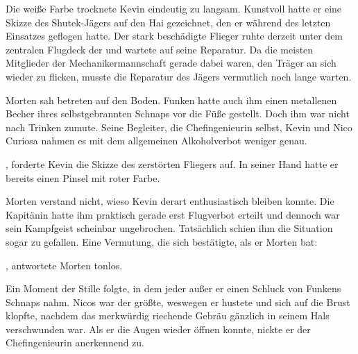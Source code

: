 Die weiße Farbe trocknete Kevin eindeutig zu langsam. Kunstvoll hatte er eine Skizze des Shutek-Jägers auf den Hai gezeichnet, den er während des letzten Einsatzes geflogen hatte. Der stark beschädigte Flieger ruhte derzeit unter dem zentralen Flugdeck der  und wartete auf seine Reparatur. Da die meisten Mitglieder der Mechanikermannschaft gerade dabei waren, den Träger an sich wieder zu flicken, musste die Reparatur des Jägers vermutlich noch lange warten.

\par

Morten sah betreten auf den Boden. Funken hatte auch ihm einen metallenen Becher ihres selbstgebrannten Schnaps vor die Füße gestellt. Doch ihm war nicht nach Trinken zumute. Seine Begleiter, die Chefingenieurin selbst, Kevin und Nico Curiosa nahmen es mit dem allgemeinen Alkoholverbot weniger genau.

\par

, forderte Kevin die Skizze des zerstörten Fliegers auf. In seiner Hand hatte er bereits einen Pinsel mit roter Farbe. 

\par

Morten verstand nicht, wieso Kevin derart enthusiastisch bleiben konnte. Die Kapitänin hatte ihm praktisch gerade erst Flugverbot erteilt und dennoch war sein Kampfgeist scheinbar ungebrochen. Tatsächlich schien ihm die Situation sogar zu gefallen. Eine Vermutung, die sich bestätigte, als er Morten bat: 

\par

, antwortete Morten tonlos.

\par

Ein Moment der Stille folgte, in dem jeder außer er einen Schluck von Funkens Schnaps nahm. Nicos war der größte, weswegen er hustete und sich auf die Brust klopfte, nachdem das merkwürdig riechende Gebräu gänzlich in seinem Hals verschwunden war. Als er die Augen wieder öffnen konnte, nickte er der Chefingenieurin anerkennend zu.

